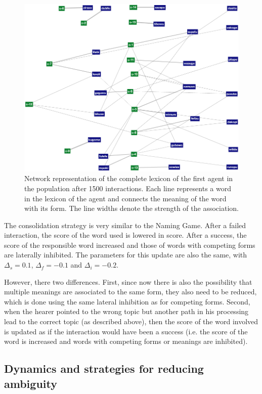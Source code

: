 \begin{figure}[t]
  \includegraphics[width=\textwidth]{figures/sgg-sw-unstructured-lexicon-1500}
  \caption{Network representation of the complete lexicon of the first
    agent in the population after 1500 interactions. Each line
    represents a word in the lexicon of the agent and connects the
    meaning of the word with its form. The line widths denote the
    strength of the association. }
  \label{f:sgg-sw-unstructured-lexicon-1500}
\end{figure}

 The consolidation strategy is very similar
to the Naming Game. After a failed interaction, the score of the word
used is lowered in score. After a success, the score of the
responsible word increased and those of words with competing forms are
laterally inhibited. The parameters for this update are also the same,
with $\Delta_s=0.1$, $\Delta_f=-0.1$ and $\Delta_i=-0.2$. 

However, there two differences. First, since now there is also the
possibility that multiple meanings are associated to the same form,
they also need to be reduced, which is done using the same lateral
inhibition as for competing forms. Second, when the hearer pointed to
the wrong topic but another path in his processing lead to the correct
topic (as described above), then the score of the word involved is
updated as if the interaction would have been a success (i.e. the
score of the word is increased and words with competing forms or
meanings are inhibited).


\subsection{Dynamics and strategies for reducing ambiguity}
\label{s:sgg-sw-unstructed-strategies}


